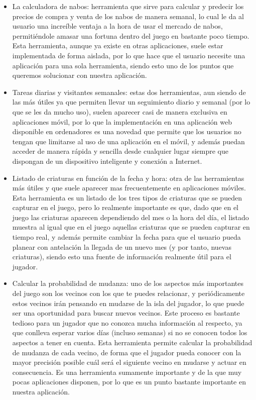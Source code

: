 \begin{itemize}
	\item La calculadora de nabos: herramienta que sirve para calcular y predecir los precios de compra y venta de los nabos de manera semanal, lo cual le da al usuario una increíble ventaja a la hora de usar el mercado de nabos, permitiéndole amasar una fortuna dentro del juego en bastante poco tiempo. Esta herramienta, aunque ya existe en otras aplicaciones, suele estar implementada de forma aislada, por lo que hace que el usuario necesite una aplicación para una sola herramienta, siendo esto uno de los puntos que queremos solucionar con nuestra aplicación.
	
	\item Tareas diarias y visitantes semanales: estas dos herramientas, aun siendo de las más útiles ya que permiten llevar un seguimiento diario y semanal (por lo que se les da mucho uso), suelen aparecer casi de manera exclusiva en aplicaciones móvil, por lo que la implementación en una aplicación web disponible en ordenadores es una novedad que permite que los usuarios no tengan que limitarse al uso de una aplicación en el móvil, y además puedan acceder de manera rápida y sencilla desde cualquier lugar siempre que dispongan de un dispositivo inteligente y conexión a Internet.
	
	\item Listado de criaturas en función de la fecha y hora: otra de las herramientas más útiles y que suele aparecer mas frecuentemente en aplicaciones móviles. Esta herramienta es un listado de los tres tipos de criaturas que se pueden capturar en el juego, pero lo realmente importante es que, dado que en el juego las criaturas aparecen dependiendo del mes o la hora del día, el listado muestra al igual que en el juego aquellas criaturas que se pueden capturar en tiempo real, y además permite cambiar la fecha para que el usuario pueda planear con antelación la llegada de un nuevo mes (y por tanto, nuevas criaturas), siendo esto una fuente de información realmente útil para el jugador.
	
	\clearpage
	
	\item Calcular la probabilidad de mudanza: uno de los aspectos más importantes del juego son los vecinos con los que te puedes relacionar, y periódicamente estos vecinos irán pensando en mudarse de la isla del jugador, lo que puede ser una oportunidad para buscar nuevos vecinos. Este proceso es bastante tedioso para un jugador que no conozca mucha información al respecto, ya que conlleva esperar varios días (incluso semanas) si no se conocen todos los aspectos a tener en cuenta. Esta herramienta permite calcular la probabilidad de mudanza de cada vecino, de forma que el jugador pueda conocer con la mayor precisión posible cuál será el siguiente vecino en mudarse y actuar en consecuencia. Es una herramienta sumamente importante y de la que muy pocas aplicaciones disponen, por lo que es un punto bastante importante en nuestra aplicación.
	

\end{itemize}
